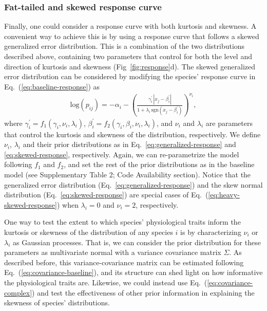 \documentclass[11pt, a4paper]{article}
\begin{document}
\subsubsection*{Fat-tailed and skewed response curve}
Finally, one could consider a response curve with both kurtosis and skewness. A convenient way to achieve this is by using a response curve that follows a skewed generalized error distribution. This is a combination of the two distributions described above, containing two parameters that control for both the level and direction of kurtosis and skewness (Fig~\ref{fig:response}d). The skewed generalized error distribution can be considered by modifying the species' response curve in Eq.~(\ref{eq:baseline-response}) as
\begin{equation}	
\begin{split}
\text{log}\left(p_{ij}\right) = -\alpha_{i} - \left(\frac{\gamma^{\prime}_{i}\,|x_{j}-\beta^{\prime}_{i}|}{1+\lambda_{i}\,\text{sgn}\left(x_{j}-\beta^{\prime}_{i}\right)}\right)^{\nu_{i}} ,
\end{split}
\label{eq:heavy-skewed-response}
\end{equation}
where $\gamma^{\prime}_{i} = f_{1}\left(\gamma_{i}, \nu_{i}, \lambda_{i}\right)$, $\beta^{\prime}_{i} = f_{2}\left(\gamma_{i}, \beta_{i}, \nu_{i}, \lambda_{i}\right)$, and $\nu_{i}$ and $\lambda_i$ are parameters that control the kurtosis and skewness of the distribution, respectively. We define $\nu_i$, $\lambda_i$ and their prior distributions as in Eq.~\ref{eq:generalized-response} and \ref{eq:skewed-response}, respectively. Again, we can re-parametrize the model following $f_1$ and $f_2$, and set the rest of the prior distributions as in the baseline model (see Supplementary Table 2; Code Availability section). Notice that the generalized error distribution (Eq.~\ref{eq:generalized-response}) and the skew normal distribution (Eq.~\ref{eq:skewed-response}) are special cases of Eq.~(\ref{eq:heavy-skewed-response}) when $\lambda_i=0$ and $\nu_i=2$, respectively.

One way to test the extent to which species' physiological traits inform the kurtosis or skewness of the distribution of any species $i$ is by characterizing $\nu_{i}$ or $\lambda_{i}$ as Gaussian processes. That is, we can consider the prior distribution for these parameters as multivariate normal with a variance covariance matrix $\Sigma$. As described before, this variance-covariance matrix can be estimated following Eq.~(\ref{eq:covariance-baseline}), and its structure can shed light on how informative the physiological traits are. Likewise, we could instead use Eq.~(\ref{eq:covariance-complex}) and test the effectiveness of other prior information in explaining the skewness of species' distributions.
\end{document}
